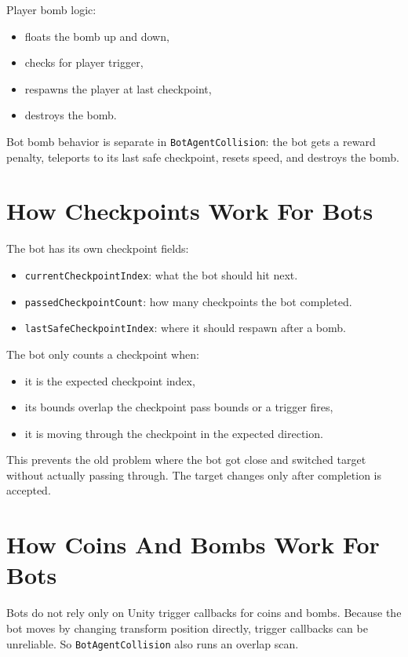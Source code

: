 \documentclass[11pt]{article}
\newcommand{\code}[1]{{\footnotesize\texttt{#1}}}
\begin{document}
Player bomb logic:

\begin{itemize}
    \item floats the bomb up and down,
    \item checks for player trigger,
    \item respawns the player at last checkpoint,
    \item destroys the bomb.
\end{itemize}

Bot bomb behavior is separate in \code{BotAgentCollision}: the bot gets a reward penalty, teleports to its last safe checkpoint, resets speed, and destroys the bomb.

\section{How Checkpoints Work For Bots}

The bot has its own checkpoint fields:

\begin{itemize}
    \item \code{currentCheckpointIndex}: what the bot should hit next.
    \item \code{passedCheckpointCount}: how many checkpoints the bot completed.
    \item \code{lastSafeCheckpointIndex}: where it should respawn after a bomb.
\end{itemize}

The bot only counts a checkpoint when:

\begin{itemize}
    \item it is the expected checkpoint index,
    \item its bounds overlap the checkpoint pass bounds or a trigger fires,
    \item it is moving through the checkpoint in the expected direction.
\end{itemize}

This prevents the old problem where the bot got close and switched target without actually passing through. The target changes only after completion is accepted.

\section{How Coins And Bombs Work For Bots}

Bots do not rely only on Unity trigger callbacks for coins and bombs. Because the bot moves by changing transform position directly, trigger callbacks can be unreliable. So \code{BotAgentCollision} also runs an overlap scan.
\end{document}
